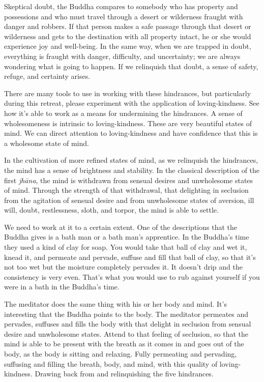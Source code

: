 Skeptical doubt, the Buddha compares to somebody who has property and
possessions and who must travel through a desert or wilderness fraught
with danger and robbers. If that person makes a safe passage through
that desert or wilderness and gets to the destination with all property
intact, he or she would experience joy and well-being. In the same way,
when we are trapped in doubt, everything is fraught with danger,
difficulty, and uncertainty; we are always wondering what is going to
happen. If we relinquish that doubt, a sense of safety, refuge, and
certainty arises.

There are many tools to use in working with these hindrances, but
particularly during this retreat, please experiment with the application
of loving-kindness. See how it’s able to work as a means for undermining
the hindrances. A sense of wholesomeness is intrinsic to
loving-kindness. These are very beautiful states of mind. We can direct
attention to loving-kindness and have confidence that this is a
wholesome state of mind.

In the cultivation of more refined states of mind, as we relinquish the
hindrances, the mind has a sense of brightness and stability. In the
classical description of the first \emph{jhāna}, the mind is withdrawn
from sensual desires and unwholesome states of mind. Through the
strength of that withdrawal, that delighting in seclusion from the
agitation of sensual desire and from unwholesome states of aversion, ill
will, doubt, restlessness, sloth, and torpor, the mind is able to
settle.

We need to work at it to a certain extent. One of the descriptions that
the Buddha gives is a bath man or a bath man’s apprentice. In the
Buddha’s time they used a kind of clay for soap. You would take that
ball of clay and wet it, knead it, and permeate and pervade, suffuse and
fill that ball of clay, so that it’s not too wet but the moisture
completely pervades it. It doesn’t drip and the consistency is very
even. That’s what you would use to rub against yourself if you were in a
bath in the Buddha’s time.

The meditator does the same thing with his or her body and mind. It’s
interesting that the Buddha points to the body. The meditator permeates
and pervades, suffuses and fills the body with that delight in seclusion
from sensual desire and unwholesome states. Attend to that feeling of
seclusion, so that the mind is able to be present with the breath as it
comes in and goes out of the body, as the body is sitting and relaxing.
Fully permeating and pervading, suffusing and filling the breath, body,
and mind, with this quality of loving-kindness. Drawing back from and
relinquishing the five hindrances.

